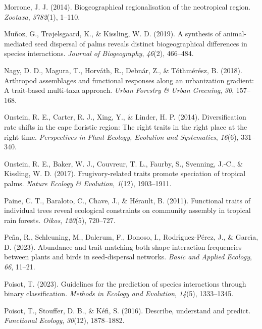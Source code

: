 \documentclass[
]{agujournal2019}
\newlength{\cslhangindent}
\newenvironment{CSLReferences}[2] %
 {\begin{list}{}{%
  \setlength{\itemindent}{0pt}
  \setlength{\leftmargin}{0pt}
  \setlength{\parsep}{0pt}
  \ifodd #1
   \setlength{\leftmargin}{\cslhangindent}
   \setlength{\itemindent}{-1\cslhangindent}
  \fi
  \setlength{\itemsep}{#2\baselineskip}}}
 {\end{list}}
\begin{document}
\begin{CSLReferences}{1}{0}
Morrone, J. J. (2014). Biogeographical regionalisation of the
neotropical region. \emph{Zootaxa}, \emph{3782}(1), 1--110.

Muñoz, G., Trøjelsgaard, K., \& Kissling, W. D. (2019). A synthesis of
animal-mediated seed dispersal of palms reveals distinct biogeographical
differences in species interactions. \emph{Journal of Biogeography},
\emph{46}(2), 466--484.

Nagy, D. D., Magura, T., Horváth, R., Debnár, Z., \& Tóthmérész, B.
(2018). Arthropod assemblages and functional responses along an
urbanization gradient: A trait-based multi-taxa approach. \emph{Urban
Forestry \& Urban Greening}, \emph{30}, 157--168.

Onstein, R. E., Carter, R. J., Xing, Y., \& Linder, H. P. (2014).
Diversification rate shifts in the cape floristic region: The right
traits in the right place at the right time. \emph{Perspectives in Plant
Ecology, Evolution and Systematics}, \emph{16}(6), 331--340.

Onstein, R. E., Baker, W. J., Couvreur, T. L., Faurby, S., Svenning,
J.-C., \& Kissling, W. D. (2017). Frugivory-related traits promote
speciation of tropical palms. \emph{Nature Ecology \& Evolution},
\emph{1}(12), 1903--1911.

Paine, C. T., Baraloto, C., Chave, J., \& Hérault, B. (2011). Functional
traits of individual trees reveal ecological constraints on community
assembly in tropical rain forests. \emph{Oikos}, \emph{120}(5),
720--727.

Peña, R., Schleuning, M., Dalerum, F., Donoso, I., Rodrı́guez-Pérez, J.,
\& Garcı́a, D. (2023). Abundance and trait-matching both shape
interaction frequencies between plants and birds in seed-dispersal
networks. \emph{Basic and Applied Ecology}, \emph{66}, 11--21.

Poisot, T. (2023). Guidelines for the prediction of species interactions
through binary classification. \emph{Methods in Ecology and Evolution},
\emph{14}(5), 1333--1345.

Poisot, T., Stouffer, D. B., \& Kéfi, S. (2016). Describe, understand
and predict. \emph{Functional Ecology}, \emph{30}(12), 1878--1882.


\end{CSLReferences}
\end{document}

